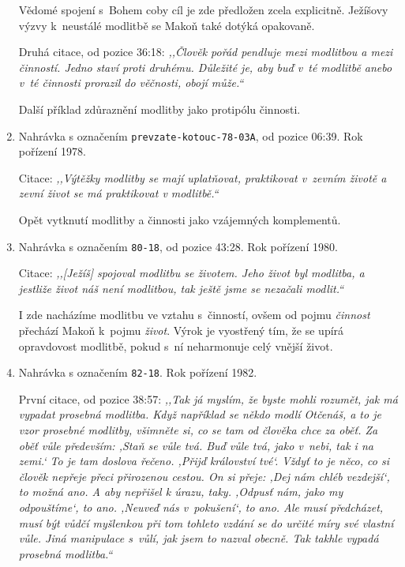 \begin{enumerate}
{    Vědomé spojení s~Bohem coby cíl je zde předložen zcela explicitně.
    Ježíšovy výzvy k~neustálé modlitbě se Makoň také dotýká opakovaně.

    Druhá citace, od pozice 36:18: \textit{%
      ,,Člověk pořád pendluje mezi modlitbou a mezi činností. Jedno staví proti
      druhému. Důležité je, aby buď v~té modlitbě anebo v~té činnosti prorazil
      do věčnosti, obojí může.``
    }

    Další příklad zdůraznění modlitby jako protipólu činnosti.
  }
  \item{
    Nahrávka s označením \texttt{prevzate-kotouc-78-03A}, od pozice 06:39.
    Rok pořízení 1978.

    Citace: \textit{%
      ,,Výtěžky modlitby se mají uplatňovat, praktikovat v~zevním životě a zevní
      život se má praktikovat v modlitbě.``
    }

    Opět vytknutí modlitby a činnosti jako vzájemných komplementů.
  }
  \item{
    Nahrávka s označením \texttt{80-18}, od pozice 43:28.
    Rok pořízení 1980.

    Citace: \textit{%
      ,,[Ježíš] spojoval modlitbu se životem. Jeho život byl modlitba, a jestli\-že
      život náš není modlitbou, tak ještě jsme se nezačali modlit.``
    }

    I zde nacházíme modlitbu ve vztahu s~činností, ovšem od pojmu
    \textit{činnost} přechází Makoň k~pojmu \textit{život}. Výrok je vyostřený
    tím, že se upírá opravdovost modlitbě, pokud s~ní neharmonuje celý vnější
    život.
  }
  \item{
    Nahrávka s označením \texttt{82-18}.
    Rok pořízení 1982.

    První citace, od pozice 38:57: \textit{%
      ,,Tak já myslím, že byste mohli rozumět, jak má vypadat prosebná modlitba.
      Když například se někdo modlí Otčenáš, a to je vzor prosebné modlitby,
      všimněte si, co se tam od člověka chce za oběť. Za oběť vůle především:
      ,Staň se vůle tvá. Buď vůle tvá, jako v~nebi, tak i na zemi.` To je tam
      doslova řečeno. ,Přijď království tvé`. Vždyť to je něco, co si člověk
      nepřeje přeci přirozenou cestou. On si přeje: ,Dej nám chléb vezdejší`,
      to možná ano. A aby nepřišel k úrazu, taky. ,Odpusť nám, jako my
      odpouštíme`, to ano. ,Neuveď nás v~pokušení`, to ano. Ale musí
      předcházet, musí být vůdčí myšlenkou při tom tohleto vzdání se do určité
      míry své vlastní vůle. Jiná manipulace s~vůlí, jak jsem to nazval obecně.
      Tak takhle vypadá prosebná modlitba.``
    }

}
\end{enumerate}
